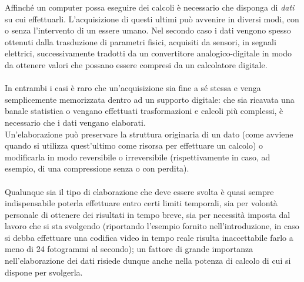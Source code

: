 Affinché un computer possa eseguire dei calcoli è necessario che disponga di
\emph{dati} su cui effettuarli. L'acquisizione di questi ultimi può avvenire
in diversi modi, con o senza l'intervento di un essere umano.
Nel secondo caso i dati vengono spesso ottenuti dalla trasduzione 
di parametri fisici, acquisiti da sensori, in segnali elettrici, successivamente
tradotti da un convertitore analogico-digitale in modo da ottenere valori che 
possano essere compresi da un calcolatore digitale.
\\ \\
In entrambi i casi è raro che un'acquisizione sia fine a sé stessa e venga
semplicemente memorizzata dentro ad un supporto digitale: che sia ricavata una
banale statistica o vengano effettuati trasformazioni e calcoli più complessi,
è necessario che i dati vengano elaborati. \\
Un'elaborazione può preservare la struttura originaria di un dato (come avviene
quando si utilizza quest'ultimo come risorsa per effettuare un calcolo) o
modificarla in modo reversibile o irreversibile (rispettivamente in caso, ad
esempio, di una compressione senza o con perdita). 
\\ \\
Qualunque sia il tipo di elaborazione che deve essere svolta è quasi sempre
indispensabile poterla effettuare entro certi limiti temporali, sia per
volontà personale di ottenere dei risultati in tempo breve, sia per
necessità imposta dal lavoro che si sta svolgendo (riportando l'esempio fornito
nell'introduzione, in caso si debba effettuare una codifica video in tempo reale
risulta inaccettabile farlo a meno di 24 fotogrammi al secondo); un fattore di
grande importanza nell'elaborazione dei dati risiede dunque anche nella potenza
di calcolo di cui si dispone per svolgerla.
